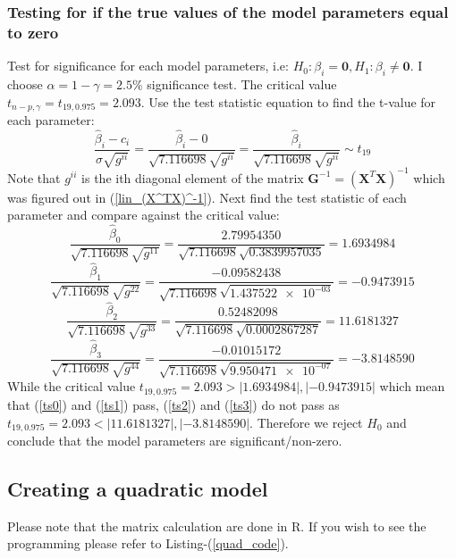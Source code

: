 \documentclass[12pt]{article}
\newcommand{\vect}[1]{\boldsymbol{#1}}
\newcommand{\trans}[1]{#1^T}
\newcommand{\est}[1]{\hat{#1}}
\begin{document}
\subsubsection{Testing for if the true values of the model parameters equal to zero}
Test for significance for each model parameters, i.e: $H_0: \beta_i = \vect{0}, H_1: \beta_i \neq \vect{0}$. I choose $\alpha = 1-\gamma = 2.5\%$ significance test. The critical value $t_{n-p, \gamma}=t_{19, 0.975} = 2.093$. Use the test statistic equation to find the t-value for each parameter:
\begin{equation*}
    \frac{\est{\beta}_i - c_i} {\est{\sigma}\sqrt{g^{ii}}}
  = \frac{\est{\beta}_i - 0} {\sqrt{7.116698}\sqrt{g^{ii}}}
  = \frac{\est{\beta}_i} {\sqrt{7.116698}\sqrt{g^{ii}}}
  \sim t_{19}
\end{equation*}
Note that $g^{ii}$ is the ith diagonal element of the matrix $\vect{G}^{-1} = (\trans{\vect{X}}\vect{X})^{-1}$ which was figured out in (\ref{lin_(X^TX)^-1}). Next find the test statistic of each parameter and compare against the critical value:
\begin{equation} \label{ts0}
    \frac{\est{\beta}_0} {\sqrt{7.116698}\sqrt{g^{11}}}
  = \frac{2.79954350} {\sqrt{7.116698}\sqrt{0.3839957035}}
  = 1.6934984
\end{equation}
\begin{equation} \label{ts1}
    \frac{\est{\beta}_1} {\sqrt{7.116698}\sqrt{g^{22}}}
  = \frac{-0.09582438} {\sqrt{7.116698}\sqrt{\num{1.437522e-03 }}}
  = -0.9473915
\end{equation}
\begin{equation} \label{ts2}
    \frac{\est{\beta}_2} {\sqrt{7.116698}\sqrt{g^{33}}}
  = \frac{0.52482098} {\sqrt{7.116698}\sqrt{0.0002867287}}
  = 11.6181327
\end{equation}
\begin{equation} \label{ts3}
    \frac{\est{\beta}_3} {\sqrt{7.116698}\sqrt{g^{44}}}
  = \frac{-0.01015172} {\sqrt{7.116698}\sqrt{\num{ 9.950471e-07}}}
  = -3.8148590
\end{equation}
While the critical value $t_{19, 0.975} = 2.093 > |1.6934984|, |-0.9473915|$ which mean that (\ref{ts0}) and (\ref{ts1}) pass, (\ref{ts2}) and (\ref{ts3}) do not pass as $t_{19, 0.975} = 2.093 < |11.6181327|, |-3.8148590|$. Therefore we reject $H_0$ and conclude that the model parameters are significant/non-zero.


\subsection{Creating a quadratic model}
Please note that the matrix calculation are done in R. If you wish to see the programming please refer to Listing-(\ref{quad_code}).
\end{document}

